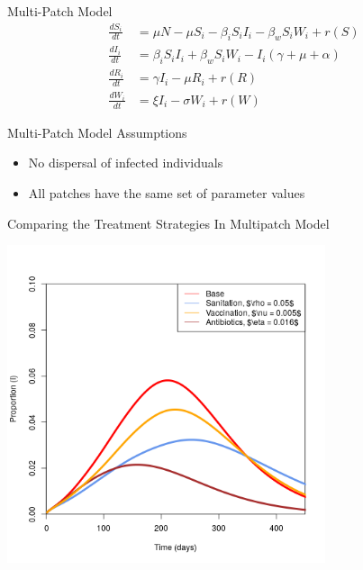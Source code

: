 \documentclass{beamer}\usepackage[]{graphicx}\usepackage[]{color}
\begin{document}
\begin{frame}[t]{Multi-Patch Model}
\begin{align*}
    \frac{dS_i}{dt}&= \mu N - \mu S_i - \beta_i S_i I_i  - \beta_w S_i W_i + r(S)\\[1em]
    \frac{dI_i}{dt}&= \beta_i S_i I_i +  \beta_w S_i W_i - I_i (\gamma + \mu + \alpha) \\[1em]
    \frac{dR_i}{dt}&= \gamma I_i - \mu R_i + r(R)\\[1em]
    \frac{dW_i}{dt}&= \xi I_i - \sigma W_i + r(W)
\end{align*}
\end{frame}

\begin{frame}{Multi-Patch Model Assumptions}
\begin{itemize}
\setlength\itemsep{2em}
\item No dispersal of infected individuals
\item All patches have the same set of parameter values
\end{itemize}
\end{frame}



\begin{frame}{Comparing the Treatment Strategies In Multipatch Model}
    \begin{center}
    \includegraphics[width=0.7\textwidth]{images/spatialTreatments.png}
    \end{center}
\end{frame}
\end{document}

